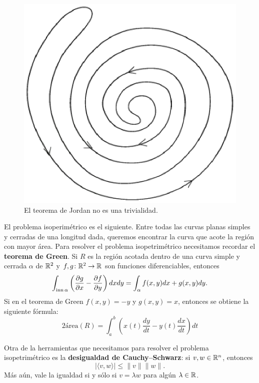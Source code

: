\begin{figure}[H]
		\centering
    	\includegraphics[scale=0.5]{eps/jordan}
		\caption{El teorema de Jordan no es una trivialidad.} 
		\label{fig:Jordan}
\end{figure}

El problema isoperimétrico es el siguiente. Entre todas las curvas planas
simples y cerradas de una longitud dada, queremos encontrar la curva que acote
la región con mayor área.	
Para resolver el problema isopetrimétrico necesitamos recordar el
\textbf{teorema de Green}. Si $R$ es la región acotada dentro de una curva
simple y cerrada $\alpha$ de $\mathbb{R}^2$ y $f,g\colon\mathbb{R}^2\to\mathbb{R}$ son funciones
diferenciables, entonces
\[
	\int_{\operatorname{inn}\alpha}\left(\frac{\partial g}{\partial x}-\frac{\partial f}{\partial y}\right)dxdy
	=\int_\alpha f(x,y)dx+g(x,y)dy.
\]
Si en el teorema de Green $f(x,y)=-y$ y $g(x,y)=x$, entonces se obtiene la
siguiente fórmula:
\[
	2\text{área}(R)=\int_a^b\left( x(t)\frac{dy}{dt}-y(t)\frac{dx}{dt}\right)dt
\]

Otra de la herramientas que necesitamos para resolver el problema
isopetrimétrico es la \textbf{desigualdad de Cauchy--Schwarz}: si $v,w\in\mathbb{R}^n$,
entonces 
\[
|\langle v,w\rangle|\leq\|v\|\|w\|.
\]
Más aún, vale la igualdad si y
sólo si $v=\lambda w$ para algún $\lambda\in\mathbb{R}$.

